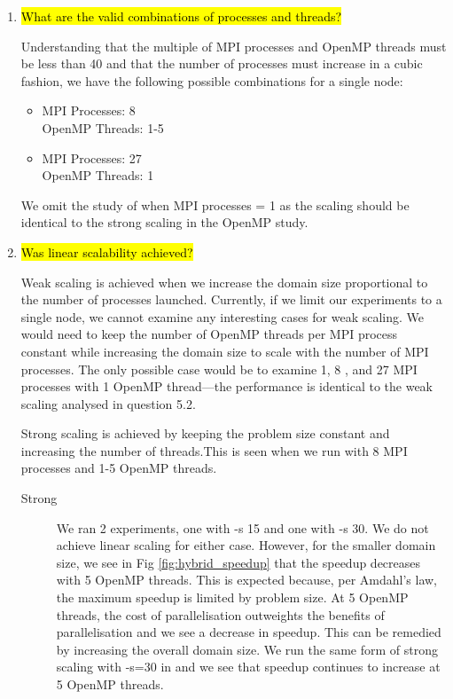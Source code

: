 \documentclass{article}
\begin{document}
\begin{enumerate}
	\item \hl{What are the valid combinations of processes and threads?}

	Understanding that the multiple of MPI processes and OpenMP threads must be less than 40 and that the number of processes must increase in a cubic fashion, we have the following possible combinations for a single node:
	\begin{itemize}
		\item   MPI Processes: 8\\
				OpenMP Threads: 1-5
		\item	MPI Processes: 27\\
				OpenMP Threads: 1
	\end{itemize}
	
	We omit the study of when MPI processes = 1 as the scaling should be identical to the strong scaling in the OpenMP study.
	
	\item \hl{Was linear scalability achieved?}
	
	Weak scaling is achieved when we increase the domain size proportional to the number of processes launched. Currently, if we limit our experiments to a single node, we cannot examine any interesting cases for weak scaling. We would need to keep the number of OpenMP threads per MPI process constant while increasing the domain size to scale with the number of MPI processes. The only possible case would be to examine 1, 8 , and 27 MPI processes with 1 OpenMP thread---the performance is identical to the weak scaling analysed in question 5.2.
	
	Strong scaling is achieved by keeping the problem size constant and increasing the number of threads.This is seen when we run with 8 MPI processes and 1-5 OpenMP threads. 
	
	\begin{description}
		\item[Strong] We ran 2 experiments, one with -s 15 and one with -s 30. We do not achieve linear scaling for either case. However, for the smaller domain size, we see in Fig \ref{fig:hybrid_speedup} that the speedup decreases with 5 OpenMP threads. This is expected because, per Amdahl's law, the maximum speedup is limited by problem size. At 5 OpenMP threads, the cost of parallelisation outweights the benefits of parallelisation and we see a decrease in speedup. This can be remedied by increasing the overall domain size. We run the same form of strong scaling with -s=30 in and we see that speedup continues to increase at 5 OpenMP threads.


\end{description}
\end{enumerate}
\end{document}
